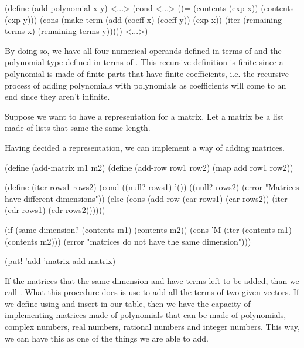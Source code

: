 \begin{code}
(define (add-polynomial x y)
  <...>
  (cond <...>
        ((= (contents (exp x)) (contents (exp y)))
         (cons (make-term (add (coeff x) (coeff y))
                          (exp x))
               (iter (remaining-terms x) (remaining-terms y)))))
    <...>)
\end{code}

By doing so, we have all four numerical operands defined in terms of \var{+} and the polynomial type defined in terms of . This recursive definition is finite since a polynomial is made of finite parts that have finite coefficients, i.e. the recursive process of adding polynomials with polynomials as coefficients will come to an end since they aren't infinite.

Suppose we want to have a representation for a matrix. Let a matrix be a list made of lists that same the same length.


Having decided a representation, we can implement a way of adding matrices.

\begin{code}
(define (add-matrix m1 m2)
  (define (add-row row1 row2)
    (map add row1 row2))

  (define (iter rows1 rows2)
    (cond ((null? rows1) '())
          ((null? rows2) (error "Matrices have different dimensions"))
          (else (cons (add-row (car rows1) (car rows2))
                      (iter (cdr rows1) (cdr rows2))))))

  (if (same-dimension? (contents m1) (contents m2))
      (cons 'M (iter (contents m1) (contents m2)))
      (error "matrices do not have the same dimension")))

(put! 'add 'matrix add-matrix)
\end{code}

If the matrices that the same dimension and have terms left to be added, than we call . What this procedure does is use  to add all the terms of two given vectors. If we define  using  and insert  in our table, then we have the capacity of implementing matrices made of polynomials that can be made of polynomials, complex numbers, real numbers, rational numbers and integer numbers. This way, we can have this as one of the things we are able to add.


